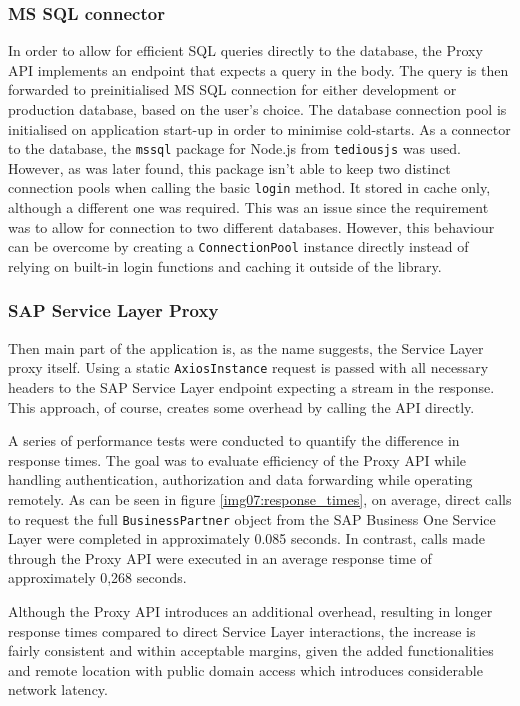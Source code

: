 \subsubsection{MS SQL connector}
In order to allow for efficient SQL queries directly to the database, the Proxy API implements an endpoint that expects a query in the body.
The query is then forwarded to preinitialised MS SQL connection for either development or production database, based on the user's choice. 
The database connection pool is initialised on application start-up in order to minimise cold-starts.
As a connector to the database, the \texttt{mssql} package for Node.js from \texttt{tediousjs} was used. However, as was later found, this package isn't able to keep two distinct connection pools when calling the basic \texttt{login} method.
It stored in cache only, although a different one was required. This was an issue since the requirement was to allow for connection to two different databases. 
However, this behaviour can be overcome by creating a \texttt{ConnectionPool} instance directly instead of relying on built-in login functions and caching it outside of the library.

\subsubsection{SAP Service Layer Proxy}
Then main part of the application is, as the name suggests, the Service Layer proxy itself. 
Using a static \texttt{AxiosInstance} request is passed with all necessary headers to the SAP Service Layer endpoint expecting a stream in the response.
This approach, of course, creates some overhead by calling the API directly. 

A series of performance tests were conducted to quantify the difference in response times. 
The goal was to evaluate efficiency of the Proxy API while handling authentication, authorization and data forwarding while operating remotely. 
As can be seen in figure \ref{img07:response_times}, on average, direct calls to request the full \texttt{BusinessPartner} object from the SAP Business One Service Layer were completed in approximately 0.085 seconds. 
In contrast, calls made through the Proxy API were executed in an average response time of approximately 0,268 seconds.

Although the Proxy API introduces an additional overhead, resulting in longer response times compared to direct Service Layer interactions, the increase is fairly consistent and within acceptable margins, given the added functionalities and remote location with public domain access which introduces considerable network latency.


